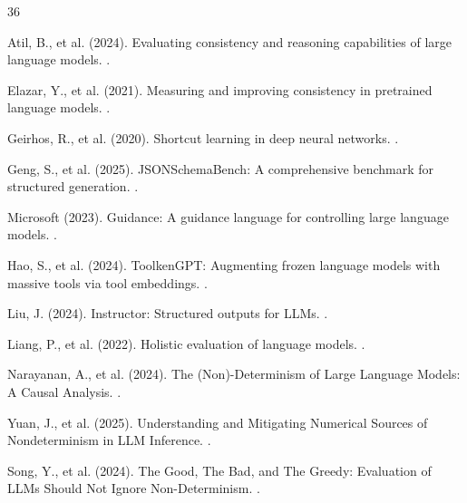 \documentclass[sigconf,anonymous,review]{acmart}
\begin{document}


\begin{thebibliography}{36}

Atil, B., et al. (2024).
\newblock Evaluating consistency and reasoning capabilities of large language models.
.

Elazar, Y., et al. (2021).
\newblock Measuring and improving consistency in pretrained language models.
.

Geirhos, R., et al. (2020).
\newblock Shortcut learning in deep neural networks.
.

Geng, S., et al. (2025).
\newblock JSONSchemaBench: A comprehensive benchmark for structured generation.
.

Microsoft (2023).
\newblock Guidance: A guidance language for controlling large language models.
.

Hao, S., et al. (2024).
\newblock ToolkenGPT: Augmenting frozen language models with massive tools via tool embeddings.
.

Liu, J. (2024).
\newblock Instructor: Structured outputs for LLMs.
.

Liang, P., et al. (2022).
\newblock Holistic evaluation of language models.
.

Narayanan, A., et al. (2024).
\newblock The (Non)-Determinism of Large Language Models: A Causal Analysis.
.

Yuan, J., et al. (2025).
\newblock Understanding and Mitigating Numerical Sources of Nondeterminism in LLM Inference.
.

Song, Y., et al. (2024).
\newblock The Good, The Bad, and The Greedy: Evaluation of LLMs Should Not Ignore Non-Determinism.
.


\end{thebibliography}
\end{document}

